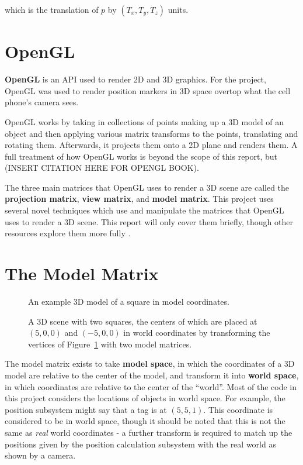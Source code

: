  which is the translation of $p$ by $(T_x, T_y, T_z)$ units.
 
 \section{OpenGL}
\textbf{OpenGL} is an API used to render 2D and 3D graphics. For the project, OpenGL was used to render position markers in 3D space overtop what the cell phone's camera sees.

OpenGL works by taking in collections of points making up a 3D model of an object and then applying various matrix transforms to the points, translating and rotating them. Afterwards, it projects them onto a 2D plane and renders them. A full treatment of how OpenGL works is beyond the scope of this report, but (INSERT CITATION HERE FOR OPENGL BOOK).

The three main matrices that OpenGL uses to render a 3D scene are called the \textbf{projection matrix}, \textbf{view matrix}, and \textbf{model matrix}. This project uses several novel techniques which use and manipulate the matrices that OpenGL uses to render a 3D scene. This report will only cover them briefly, though other resources explore them more fully \cite{CodingLabs}.

\section{The Model Matrix}
\begin{figure}
	\centering
	
	\decoRule
	\caption{An example 3D model of a square in model coordinates.}
	\label{fig:ModelExample}
\end{figure}
\begin{figure}
	\centering
	
	\decoRule
	\caption{A 3D scene with two squares, the centers of which are placed at $(5, 0, 0)$ and $(-5, 0, 0)$ in world coordinates by transforming the vertices of Figure~\ref{fig:ModelExample} with two model matrices.}
	\label{fig:ModelMatrixExample}
\end{figure}

The model matrix exists to take \textbf{model space}, in which the coordinates of a 3D model are relative to the center of the model, and transform it into \textbf{world space}, in which coordinates are relative to the center of the ``world''. Most of the code in this project considers the locations of objects in world space. For example, the position subsystem might say that a tag is at $(5, 5, 1)$. This coordinate is considered to be in world space, though it should be noted that this is not the same as \emph{real} world coordinates - a further transform is required to match up the positions given by the position calculation subsystem with the real world as shown by a camera.

